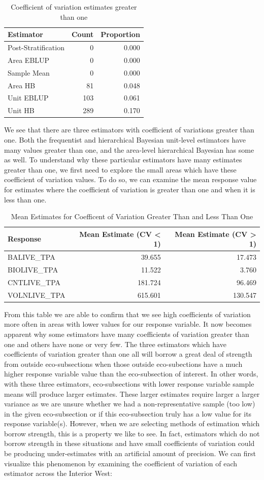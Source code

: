 \documentclass[12pt,twoside]{reedthesis}
\begin{document}
\begin{longtable}[t]{lrr}
\caption{\label{tab:over-one}Coefficient of variation estimates greater than one}\\
\toprule
Estimator & Count & Proportion\\
\midrule
Post-Stratification & 0 & 0.000\\
Area EBLUP & 0 & 0.000\\
Sample Mean & 0 & 0.000\\
Area HB & 81 & 0.048\\
Unit EBLUP & 103 & 0.061\\
\addlinespace
Unit HB & 289 & 0.170\\
\bottomrule
\end{longtable}
We see that there are three estimators with coefficient of variations greater than one. Both the frequentist and hierarchical Bayesian unit-level estimators have many values greater than one, and the area-level hierarchical Bayesian has some as well. To understand why these particular estimators have many estimates greater than one, we first need to explore the small areas which have these coefficient of variation values. To do so, we can examine the mean response value for estimates where the coefficient of variation is greater than one and when it is less than one.
\clearpage
\begin{longtable}[t]{lrr}
\caption{\label{tab:covg1l1}Mean Estimates for Coefficent of Variation Greater Than and Less Than One}\\
\toprule
Response & Mean Estimate (CV < 1) & Mean Estimate (CV > 1)\\
\midrule
BALIVE\_TPA & 39.655 & 17.473\\
BIOLIVE\_TPA & 11.522 & 3.760\\
CNTLIVE\_TPA & 181.724 & 96.469\\
VOLNLIVE\_TPA & 615.601 & 130.547\\
\bottomrule
\end{longtable}
From this table we are able to confirm that we see high coefficients of variation more often in areas with lower values for our response variable. It now becomes apparent why some estimators have many coefficients of variation greater than one and others have none or very few. The three estimators which have coefficients of variation greater than one all will borrow a great deal of strength from outside eco-subsections when those outside eco-subections have a much higher response variable value than the eco-subsection of interest. In other words, with these three estimators, eco-subsections with lower response variable sample means will produce larger estimates. These larger estimates require larger a larger variance as we are unsure whether we had a non-representative sample (too low) in the given eco-subsection or if this eco-subsection truly has a low value for its response variable(s). However, when we are selecting methods of estimation which borrow strength, this is a property we like to see. In fact, estimators which do not borrow strength in these situations and have small coefficients of variation could be producing under-estimates with an artificial amount of precision. We can first visualize this phenomenon by examining the coefficient of variation of each estimator across the Interior West:
\end{document}
